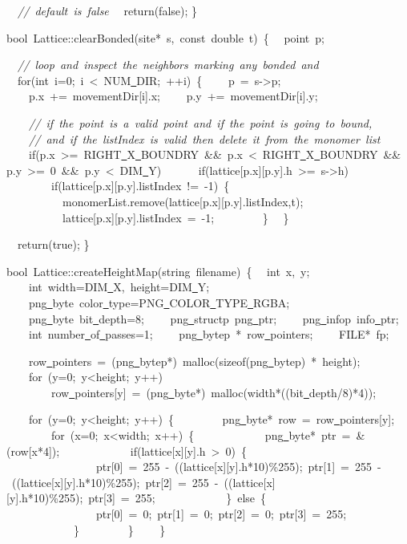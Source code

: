 {\ \ \textsl{//\ default\ is\ false}
\ \ return(false);
\}

bool\ Lattice::clearBonded(site*\ s,\ const\ double\ t)\ \{
\ \ point\ p;

\ \ \textsl{//\ loop\ and\ inspect\ the\ neighbors\ marking\ any\ bonded\ and}
\ \ for(int\ i=0;\ i\ <{}\ NUM\underline\ DIR;\ ++i)\ \{
\ \ \ \ p\ =\ s-{}>{}p;
\ \ \ \ p.x\ +=\ movementDir[i].x;
\ \ \ \ p.y\ +=\ movementDir[i].y;

\ \ \ \ \textsl{//\ if\ the\ point\ is\ a\ valid\ point\ and\ if\ the\ point\ is\ going\ to\ bound,}
\ \ \ \ \textsl{//\ and\ if\ the\ listIndex\ is\ valid\ then\ delete\ it\ from\ the\ monomer\ list}
\ \ \ \ if(p.x\ >{}=\ RIGHT\underline\ X\underline\ BOUNDRY\ \&\&\ p.x\ <{}\ RIGHT\underline\ X\underline\ BOUNDRY\ \&\&\ p.y\ >{}=\ 0\ \&\&\ p.y\ <{}\ DIM\underline\ Y)
\ \ \ \ \ \ if(lattice[p.x][p.y].h\ >{}=\ s-{}>{}h)
\ \ \ \ \ \ \ \ if(lattice[p.x][p.y].listIndex\ !=\ -{}1)\ \{
\ \ \ \ \ \ \ \ \ \ monomerList.remove(lattice[p.x][p.y].listIndex,t);
\ \ \ \ \ \ \ \ \ \ lattice[p.x][p.y].listIndex\ =\ -{}1;
\ \ \ \ \ \ \ \ \}
\ \ \}

\ \ return(true);
\}

bool\ Lattice::createHeightMap(string\ filename)\ \{
\ \ int\ x,\ y;
\ \ \ \ int\ width=DIM\underline\ X,\ height=DIM\underline\ Y;
\ \ \ \ png\underline\ byte\ color\underline\ type=PNG\underline\ COLOR\underline\ TYPE\underline\ RGBA;
\ \ \ \ png\underline\ byte\ bit\underline\ depth=8;
\ \ \ \ png\underline\ structp\ png\underline\ ptr;
\ \ \ \ png\underline\ infop\ info\underline\ ptr;
\ \ \ \ int\ number\underline\ of\underline\ passes=1;
\ \ \ \ png\underline\ bytep\ *\ row\underline\ pointers;
\ \ \ \ FILE*\ fp;

\ \ \ \ row\underline\ pointers\ =\ (png\underline\ bytep*)\ malloc(sizeof(png\underline\ bytep)\ *\ height);
\ \ \ \ for\ (y=0;\ y<{}height;\ y++)
\ \ \ \ \ \ \ \ row\underline\ pointers[y]\ =\ (png\underline\ byte*)\ malloc(width*((bit\underline\ depth/8)*4));

\ \ \ \ for\ (y=0;\ y<{}height;\ y++)\ \{
\ \ \ \ \ \ \ \ png\underline\ byte*\ row\ =\ row\underline\ pointers[y];
\ \ \ \ \ \ \ \ for\ (x=0;\ x<{}width;\ x++)\ \{
\ \ \ \ \ \ \ \ \ \ \ \ png\underline\ byte*\ ptr\ =\ \&(row[x*4]);
\ \ \ \ \ \ \ \ \ \ \ \ if(lattice[x][y].h\ >{}\ 0)\ \{
\ \ \ \ \ \ \ \ \ \ \ \ \ \ \ \ ptr[0]\ =\ 255\ -{}\ ((lattice[x][y].h*10)\%255);\ ptr[1]\ =\ 255\ -{}\ ((lattice[x][y].h*10)\%255);\ ptr[2]\ =\ 255\ -{}\ ((lattice[x][y].h*10)\%255);\ ptr[3]\ =\ 255;
\ \ \ \ \ \ \ \ \ \ \ \ \}\ else\ \{
\ \ \ \ \ \ \ \ \ \ \ \ \ \ \ \ ptr[0]\ =\ 0;\ ptr[1]\ =\ 0;\ ptr[2]\ =\ 0;\ ptr[3]\ =\ 255;
\ \ \ \ \ \ \ \ \ \ \ \ \}
\ \ \ \ \ \ \ \ \}
\ \ \ \ \}

}
